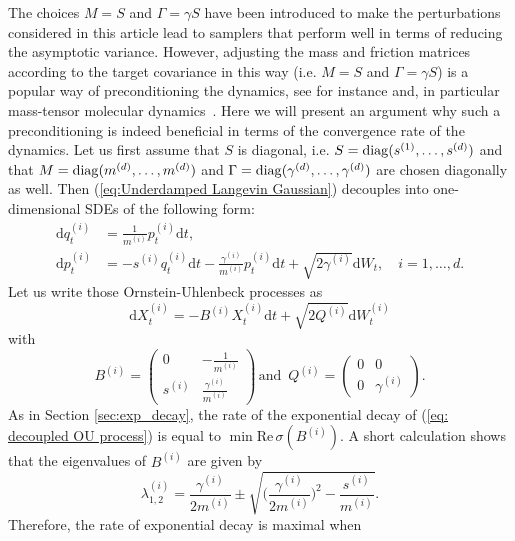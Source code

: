 \begin{remark}
	The choices $M=S$ and $\Gamma=\gamma S$ have been introduced to
	make the perturbations considered in this article lead to samplers that perform well in terms of reducing the asymptotic variance. However, adjusting
	the mass and friction matrices according to the target covariance
	in this way (i.e. $M=S$ and $\Gamma=\gamma S$) is a popular way of preconditioning the dynamics, see for instance \cite{GirolamiCalderhead2011} and, in particular mass-tensor molecular dynamics~\cite{Bennett1975267}. Here we will present an argument why such a preconditioning
	is indeed beneficial in terms of the convergence rate of the dynamics.
	Let us first assume that $S$ is diagonal, i.e. $S=\operatorname{diag}(s^{(1)},\ldots,s^{(d)})$
	and that $M=\operatorname{diag}(m^{(d)},\ldots,m^{(d)})$ and $\Gamma=\operatorname{diag}(\gamma^{(d)},\ldots,\gamma^{(d)})$
	are chosen diagonally as well. Then (\ref{eq:Underdamped Langevin Gaussian})
	decouples into one-dimensional SDEs of the following form: 
	\begin{align}
	\mathrm{d}q_{t}^{(i)} & =\frac{1}{m^{(i)}}p_{t}^{(i)}\mathrm{d}t,\nonumber \\
	\mathrm{d}p_{t}^{(i)} & =-s^{(i)}q_{t}^{(i)}\mathrm{d}t-\frac{\gamma^{(i)}}{m^{(i)}}p_{t}^{(i)}\mathrm{d}t+\sqrt{2\gamma^{(i)}}\mathrm{d}W_{t},\quad i=1,\ldots,d.\label{eq:decoupled Langevin}
	\end{align}
	Let us write those Ornstein-Uhlenbeck processes as 
	\begin{equation}
	\mathrm{d}X_{t}^{(i)}=-B^{(i)}X_{t}^{(i)}\mathrm{d}t+\sqrt{2Q^{(i)}}\mathrm{d}W_{t}^{(i)}\label{eq: decoupled OU process}
	\end{equation}
	with 
	\[
	B^{(i)}=\left(\begin{array}{cc}
	0 & -\frac{1}{m^{(i)}}\\
	s^{(i)} & \frac{\gamma^{(i)}}{m^{(i)}}
	\end{array}\right)\,\text{and }\,Q^{(i)}=\left(\begin{array}{cc}
	0 & 0\\
	0 & \gamma^{(i)}
	\end{array}\right).
	\]
	As in Section \ref{sec:exp_decay}, the rate of the exponential decay of (\ref{eq: decoupled OU process}) is equal to $\min\text{Re}\,\sigma(B^{(i)})$. A short calculation shows that the eigenvalues of $B^{(i)}$ are given by  
	\[
	\lambda_{1,2}^{(i)}=\frac{\gamma^{(i)}}{2m^{(i)}}\pm\sqrt{\bigg(\frac{\gamma^{(i)}}{2m^{(i)}}\bigg)^{2}-\frac{s^{(i)}}{m^{(i)}}}.
	\]
	Therefore, the rate of exponential decay is maximal when 

\end{remark}
